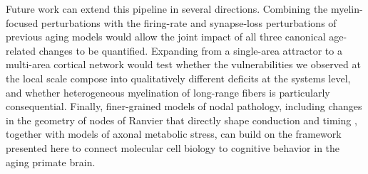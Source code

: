 \documentclass[11pt]{article}
\begin{document}
Future work can extend this pipeline in several directions. Combining the myelin-focused perturbations with the firing-rate and synapse-loss perturbations of previous aging models \citep{ibanez2020network,chang2005firing,coskren2015aging} would allow the joint impact of all three canonical age-related changes to be quantified. Expanding from a single-area attractor to a multi-area cortical network would test whether the vulnerabilities we observed at the local scale compose into qualitatively different deficits at the systems level, and whether heterogeneous myelination of long-range fibers is particularly consequential. Finally, finer-grained models of nodal pathology, including changes in the geometry of nodes of Ranvier that directly shape conduction and timing \citep{smith2024nodal,devaux2008tight}, together with models of axonal metabolic stress, can build on the framework presented here to connect molecular cell biology to cognitive behavior in the aging primate brain.



\end{document}
